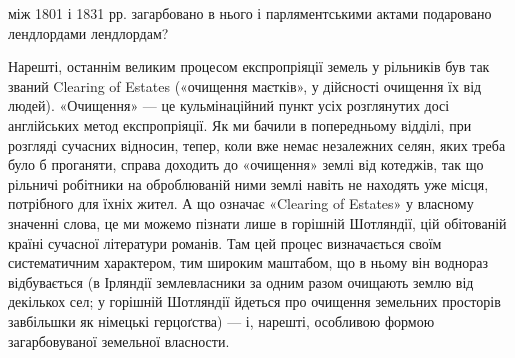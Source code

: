 \parcont{}  %
між 1801 і 1831 рр. загарбовано в нього і парляментськими актами подаровано лендлордами лендлордам?

Нарешті, останнім великим процесом експропріяції земель у рільників був так званий Clearing of
Estates («очищення маєтків», у дійсності очищення їх від людей). «Очищення» — це кульмінаційний
пункт усіх розглянутих досі англійських метод експропріяції. Як ми бачили в попередньому відділі,
при розгляді сучасних відносин, тепер, коли вже немає незалежних селян, яких треба було б проганяти,
справа доходить до «очищення» землі від котеджів, так що рільничі робітники на оброблюваній ними
землі навіть не находять уже місця, потрібного для їхніх жител. А що означає «Clearing of Estates» у
власному значенні слова, це ми можемо пізнати лише в горішній Шотляндії, цій обітованій країні
сучасної літератури романів. Там цей процес
визначається своїм систематичним характером, тим широким маштабом, що в ньому він воднораз
відбувається (в Ірляндії землевласники за одним разом очищають землю від декількох сел; у горішній
Шотляндії йдеться про очищення земельних просторів
завбільшки як німецькі герцоґства) — і, нарешті, особливою формою загарбовуваної земельної
власности.

